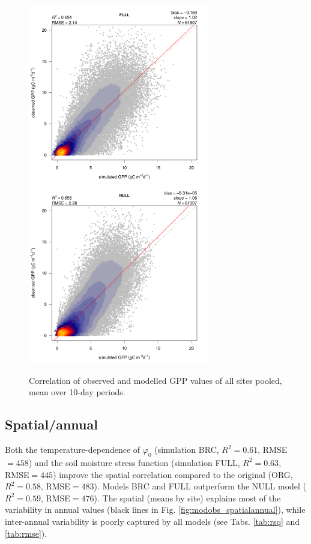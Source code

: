 \documentclass{myreport}
\begin{document}
\begin{figure}[!ht]
    \centering
    \includegraphics[width=0.7\textwidth]{fig/modobs_xdaily_FULL.pdf}
    \includegraphics[width=0.7\textwidth]{fig/modobs_xdaily_NULL.pdf}
    \caption{Correlation of observed and modelled GPP values of all sites pooled, mean over 10-day periods.}
    \label{fig:modobs_xdaily}
\end{figure}

\clearpage

\subsection{Spatial/annual}

Both the temperature-dependence of $\varphi_0$ (simulation BRC, $R^2=0.61$, RMSE$=458$) and the soil moisture stress function (simulation FULL, $R^2=0.63$, RMSE$=445$) improve the spatial correlation compared to the original (ORG, $R^2=0.58$, RMSE$=483$). Models BRC and FULL outperform the NULL model ($R^2=0.59$, RMSE$=476$). The spatial (means by site) explains most of the variability in annual values (black lines in Fig. \ref{fig:modobs_spatialannual}), while inter-annual variability is poorly captured by all models (see Tabs. \ref{tab:rsq} and \ref{tab:rmse}).
\end{document}
